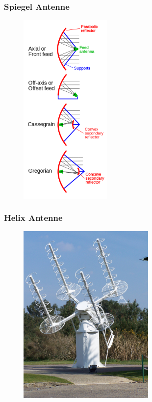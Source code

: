 \begin{frame}
  \frametitle{Spiegel Antenne}
  \begin{center}
    \begin{figure}
      \includegraphics[width=0.4\textwidth,height=.75\textheight,keepaspectratio]{a09/Parabolic_antenna_types.png}
    \end{figure}
  \end{center}
\end{frame}


\begin{frame}
  \frametitle{Helix Antenne}
  \begin{center}
    \begin{figure}
      \includegraphics[width=0.6\textwidth,height=.75\textheight,keepaspectratio]{a09/Traqueur_acquisition.JPG}
    \end{figure}
  \end{center}
\end{frame}


